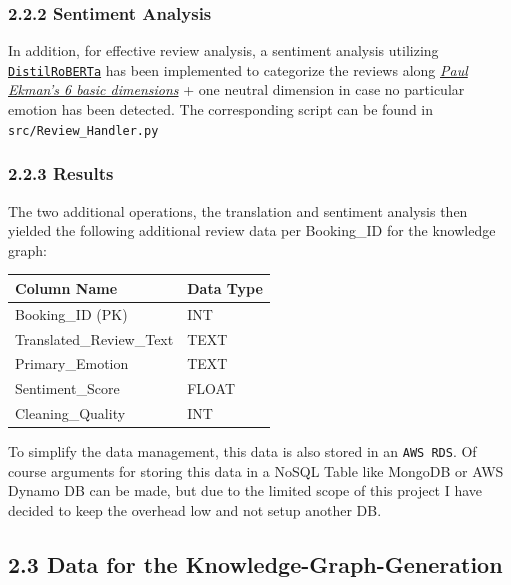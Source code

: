 \documentclass[
]{article}
\begin{document}
\subsubsection{2.2.2 Sentiment Analysis}\label{sentiment-analysis}

In addition, for effective review analysis, a sentiment analysis
utilizing
\href{https://huggingface.co/j-hartmann/emotion-english-distilroberta-base}{\texttt{DistilRoBERTa}}
has been implemented to categorize the reviews along
\href{https://www.paulekman.com/wp-content/uploads/2013/07/Basic-Emotions.pdf}{\textit{Paul
Ekman's 6 basic dimensions}} + one neutral dimension in case no particular
emotion has been detected. The corresponding script can be found in
\texttt{src/Review\_Handler.py}

\subsubsection{2.2.3 Results}\label{results}

The two additional operations, the translation and sentiment analysis
then yielded the following additional review data per Booking\_ID for
the knowledge graph:

\begin{longtable}[]{@{}
  >{\raggedright\arraybackslash}p{}
  >{\raggedright\arraybackslash}p{}@{}}
\toprule\noalign{}
Column Name & Data Type \\
\midrule\noalign{}
\endhead
\bottomrule\noalign{}
\endlastfoot
Booking\_ID (PK) & INT \\
Translated\_Review\_Text & TEXT \\
Primary\_Emotion & TEXT \\
Sentiment\_Score & FLOAT \\
Cleaning\_Quality & INT \\
\end{longtable}


To simplify the data management, this data is also stored in an \texttt{AWS RDS}.
Of course arguments for storing this data in a NoSQL Table like MongoDB
or AWS Dynamo DB can be made, but due to the limited scope of this
project I have decided to keep the overhead low and not setup another
DB.

\subsection{2.3 Data for the
Knowledge-Graph-Generation}\label{data-for-the-knowledge-graph-generation}
\end{document}
